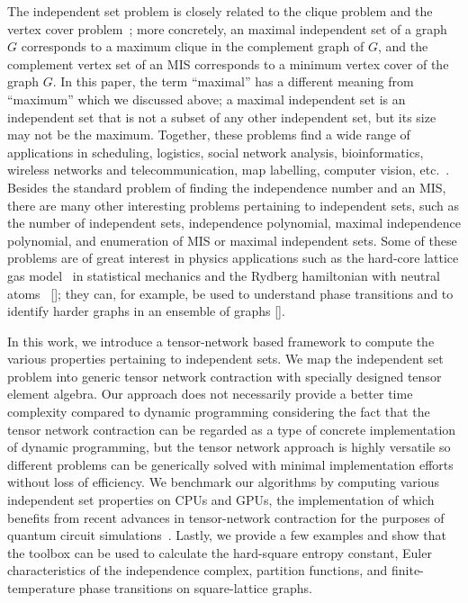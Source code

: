 \documentclass[onefignum, onetabnum]{siamart190516}
\newcommand{\<}{\langle}
\renewcommand{\>}{\rangle}
\newcommand{\red}[1]{[{\bf  \color{red}{ST: #1}}]}
\newcounter{example}
\begin{document}
The independent set problem is closely related to the clique problem and the vertex cover problem~\cite{Moore2011};
more concretely, an maximal independent set of a graph $G$ corresponds to a maximum clique in the complement graph of $G$,
and the complement vertex set of an MIS corresponds to a minimum vertex cover of the graph $G$.
In this paper, the term ``maximal'' has a different meaning from ``maximum''  which we discussed above; a maximal independent set is an independent set that is not a subset of any other independent set, but its size may not be the maximum.
Together, these problems find a wide range of applications in scheduling, logistics, social network analysis, bioinformatics, wireless networks and telecommunication,
map labelling, computer vision, etc.~\cite{Butenko2003, Wu2015}.
Besides the standard problem of finding the independence number and an MIS, there are many other interesting problems pertaining to independent sets, such as the number of independent sets,
independence polynomial, maximal independence polynomial, and enumeration of MIS or maximal independent sets.
Some of these problems are of great interest in physics applications such as the hard-core lattice gas model~\cite{Dyre2016, Fernandes2007}
in statistical mechanics and the Rydberg hamiltonian with neutral atoms~\cite{Pichler2018} \red{cite experiment when it's ready};
they can, for example, be used to understand phase transitions and to identify harder graphs in an ensemble of graphs \red{cite experiment}.

In this work, we introduce a tensor-network based framework to compute the various properties pertaining to independent sets.
We map the independent set problem into generic tensor network contraction with specially designed tensor element algebra.
Our approach does not necessarily provide a better time complexity compared to dynamic programming considering the fact that the tensor network contraction can be regarded as a type of concrete implementation of dynamic programming,
but the tensor network approach is highly versatile so different problems can be generically solved with minimal implementation efforts without loss of efficiency.
We benchmark our algorithms by computing various independent set properties on CPUs and GPUs, the implementation of which benefits from recent advances in tensor-network contraction for the purposes of quantum circuit simulations~\cite{Gray2021, Pan2021, Kalachev2021}.
Lastly, we provide a few examples and show that the toolbox can be used to calculate the hard-square entropy constant,
Euler characteristics of the independence complex, partition functions, and finite-temperature phase transitions on square-lattice graphs. 
\end{document}

